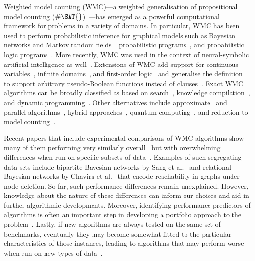 \documentclass[runningheads]{llncs}
\begin{document}
Weighted model counting (\textsf{WMC})---a weighted generalisation of
propositional model counting
($\#\SAT{}$)~\cite{DBLP:journals/ai/ChaviraD08}---has emerged as a powerful
computational framework for problems in a variety of domains. In particular,
\textsf{WMC} has been used to perform probabilistic inference for graphical
models such as Bayesian networks and Markov random
fields~\cite{DBLP:conf/ecai/BartKLM16,DBLP:conf/ijcai/ChaviraD05,DBLP:conf/sat/ChaviraD06,DBLP:conf/kr/Darwiche02,DBLP:conf/aaai/SangBK05},
probabilistic programs~\cite{DBLP:journals/pacmpl/HoltzenBM20}, and
probabilistic logic programs~\cite{DBLP:journals/tplp/FierensBRSGTJR15}. More
recently, \textsf{WMC} was used in the context of neural-symbolic artificial
intelligence as well~\cite{DBLP:conf/icml/XuZFLB18}. Extensions of \textsf{WMC}
add support for continuous variables~\cite{DBLP:conf/ijcai/BellePB15}, infinite
domains~\cite{DBLP:conf/aaai/Belle17}, and first-order
logic~\cite{DBLP:conf/ijcai/BroeckTMDR11,DBLP:journals/cacm/GogateD16} and
generalise the definition to support arbitrary pseudo-Boolean functions instead
of clauses~\cite{DBLP:conf/sat/DilkasB21}. Exact \textsf{WMC} algorithms can be
broadly classified as based on
search~\cite{DBLP:conf/sat/SangBBKP04,DBLP:conf/ijcai/SharmaRSM19}, knowledge
compilation~\cite{DBLP:conf/ecai/Darwiche04,DBLP:conf/ijcai/LagniezM17,DBLP:conf/ijcai/OztokD15},
and dynamic programming~\cite{DBLP:conf/aaai/DudekPV20,DBLP:conf/cp/DudekPV20}.
Other alternatives include approximate~\cite{DBLP:conf/aaai/RenkensKBR14} and
parallel algorithms~\cite{DBLP:conf/pgm/DalLL18,DBLP:conf/esa/FichteHWZ18},
hybrid approaches~\cite{DBLP:conf/sat/HecherTW20}, quantum
computing~\cite{DBLP:conf/ecai/Riguzzi20}, and reduction to model
counting~\cite{DBLP:conf/ijcai/ChakrabortyFMV15}.

Recent papers that include experimental comparisons of \textsf{WMC}
algorithms show many of them performing very similarly
overall~\cite{DBLP:conf/aaai/DudekPV20,DBLP:conf/cp/DudekPV20} but with
overwhelming differences when run on specific subsets of
data~\cite{DBLP:conf/uai/DilkasB21,DBLP:conf/sat/DilkasB21,DBLP:conf/ijcai/LagniezM17}.
Examples of such segregating data sets include bipartite Bayesian networks by
Sang et al.~\cite{DBLP:conf/aaai/SangBK05} and
relational Bayesian networks by
Chavira et al.~\cite{DBLP:journals/ijar/ChaviraDJ06}
that encode reachability in graphs under node deletion. So far, such performance
differences remain unexplained. However, knowledge about the nature of these
differences can inform our choices and aid in further algorithmic developments.
Moreover, identifying performance predictors of algorithms is often an important
step in developing a portfolio approach to the
problem~\cite{DBLP:journals/jair/XuHHL08}. Lastly, if new algorithms are always
tested on the same set of benchmarks, eventually they may become somewhat fitted
to the particular characteristics of those instances, leading to algorithms that
may perform worse when run on new types of
data~\cite{DBLP:conf/cec/HossainALA10}.
\end{document}
